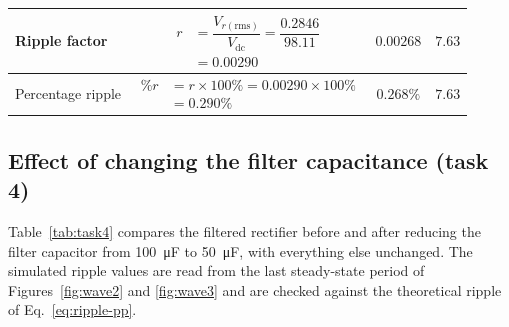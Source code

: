 \documentclass[12pt,a4paper]{article}
\begin{document}
\begin{table}[H]
\begin{tabular}{|>{\raggedright\arraybackslash}p{2.7cm}|c|c|c|}
			\hline
			Ripple factor & $\begin{aligned}r &= \dfrac{V_{r(\mathrm{rms})}}{V_{\mathrm{dc}}} = \dfrac{0.2846}{98.11} \\ &= 0.00290\end{aligned}$ & $0.00268$ & $7.63$ \\
			\hline
			Percentage ripple & $\begin{aligned}\%r &= r\times100\% = 0.00290\times100\% \\ &= 0.290\%\end{aligned}$ & $0.268\%$ & $7.63$ \\
			\hline
		\end{tabular}
	\end{table}
	
	
	\subsection{Effect of changing the filter capacitance (task 4)}
	\label{sec:task4}
	Table~\ref{tab:task4} compares the filtered rectifier before and after reducing the filter capacitor from \SI{100}{\micro\farad} to \SI{50}{\micro\farad}, with everything else unchanged. The simulated ripple values are read from the last steady-state period of Figures~\ref{fig:wave2} and \ref{fig:wave3} and are checked against the theoretical ripple of Eq.~\eqref{eq:ripple-pp}.
	
\end{document}

